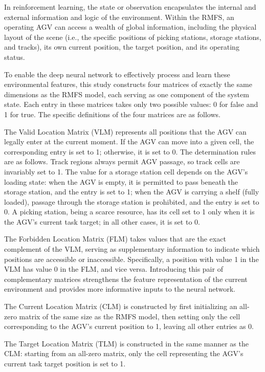 In reinforcement learning, the state or observation encapsulates the internal and external information and logic of the environment. Within the RMFS, an operating AGV can access a wealth of global information, including the physical layout of the scene (i.e., the specific positions of picking stations, storage stations, and tracks), its own current position, the target position, and its operating status.

To enable the deep neural network to effectively process and learn these environmental features, this study constructs four matrices of exactly the same dimensions as the RMFS model, each serving as one component of the system state. Each entry in these matrices takes only two possible values: 0 for false and 1 for true. The specific definitions of the four matrices are as follows.

The Valid Location Matrix (VLM) represents all positions that the AGV can legally enter at the current moment. If the AGV can move into a given cell, the corresponding entry is set to 1; otherwise, it is set to 0. The determination rules are as follows. Track regions always permit AGV passage, so track cells are invariably set to 1. The value for a storage station cell depends on the AGV's loading state: when the AGV is empty, it is permitted to pass beneath the storage station, and the entry is set to 1; when the AGV is carrying a shelf (fully loaded), passage through the storage station is prohibited, and the entry is set to 0. A picking station, being a scarce resource, has its cell set to 1 only when it is the AGV's current task target; in all other cases, it is set to 0.

The Forbidden Location Matrix (FLM) takes values that are the exact complement of the VLM, serving as supplementary information to indicate which positions are accessible or inaccessible. Specifically, a position with value 1 in the VLM has value 0 in the FLM, and vice versa. Introducing this pair of complementary matrices strengthens the feature representation of the current environment and provides more informative inputs to the neural network.

The Current Location Matrix (CLM) is constructed by first initializing an all-zero matrix of the same size as the RMFS model, then setting only the cell corresponding to the AGV's current position to 1, leaving all other entries as 0.

The Target Location Matrix (TLM) is constructed in the same manner as the CLM: starting from an all-zero matrix, only the cell representing the AGV's current task target position is set to 1.


